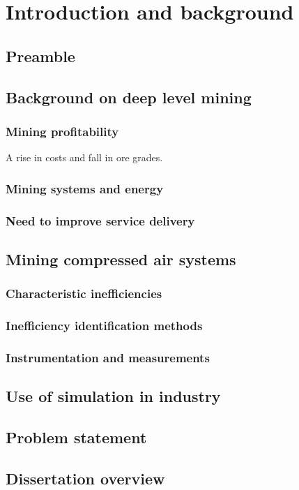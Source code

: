 \chapter{Introduction and background}  %
\setcounter{page}{1}
\section{Preamble}

\section{Background on deep level mining}

\subsection{Mining profitability}
A rise in costs and fall in ore grades.\cite{Nein_Tho}
\begin{figure}
	\centering
	
\end{figure} 



\subsection{Mining systems and energy}
\subsection{Need to improve service delivery}
\section{Mining compressed air systems}
	\subsection{Characteristic inefficiencies}
	\subsection{Inefficiency identification methods}
	\subsection{Instrumentation and measurements}
\section{Use of simulation in industry}
\section{Problem statement}
\section{Dissertation overview}